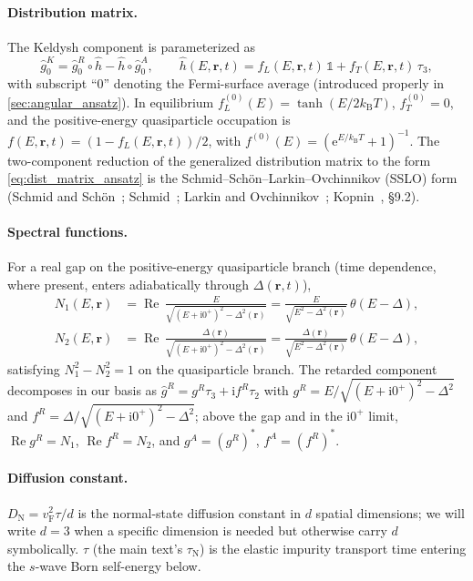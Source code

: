 \documentclass[
  aps,
  prb,
  preprint,
  superscriptaddress,
  longbibliography,
  nofootinbib
]{revtex4-2}
\newcommand{\ee}{\mathrm{e}}
\newcommand{\ii}{\mathrm{i}}
\newcommand{\br}{\mathbf{r}}
\newcommand{\vF}{v_{\mathrm{F}}}
\newcommand{\DOS}{N_1}
\newcommand{\DN}{D_{\mathrm{N}}}
\newcommand{\fL}{f_L}
\newcommand{\fT}{f_T}
\newcommand{\hatg}{\hat{g}}
\providecommand{\openone}{}\renewcommand{\openone}{\mathds{1}}
\newcommand{\Real}{\operatorname{Re}}
\begin{document}
\paragraph{Distribution matrix.} The Keldysh component is parameterized as
\begin{equation}
  \hatg_{0}^{K}
  =
  \hatg_{0}^{R}\circ \hat h - \hat h\circ \hatg_{0}^{A},
  \qquad
  \hat h(E,\br,t)=\fL(E,\br,t)\,\openone+\fT(E,\br,t)\,\tau_3 ,
  \label{eq:dist_matrix_ansatz}
\end{equation}
with subscript ``\(0\)'' denoting the Fermi-surface average (introduced
properly in \cref{sec:angular_ansatz}). In equilibrium
\(\fL^{(0)}(E)=\tanh(E/2k_{\mathrm B}T)\), \(\fT^{(0)}=0\), and the positive-energy
quasiparticle occupation is
\(f(E,\br,t)=(1-\fL(E,\br,t))/2\), with
\(f^{(0)}(E)=(\ee^{E/k_{\mathrm B}T}+1)^{-1}\). The two-component reduction of the
generalized distribution matrix to the form
\cref{eq:dist_matrix_ansatz} is the
Schmid--Sch\"on--Larkin--Ovchinnikov (SSLO) form
(Schmid and Sch\"on~\cite{schmidschon1975}; Schmid~\cite{schmid1980}; Larkin and Ovchinnikov~\cite{larkin1986};
Kopnin~\cite{kopnin2001}, \S 9.2).

\paragraph{Spectral functions.} For a real gap on the positive-energy
quasiparticle branch (time dependence, where present, enters adiabatically
through \(\Delta(\br,t)\)),
\begin{align}
  \DOS(E,\br) &= \Real\,\frac{E}{\sqrt{(E+\ii 0^+)^2-\Delta^2(\br)}}
              = \frac{E}{\sqrt{E^2-\Delta^2(\br)}}\,\theta(E-\Delta), \\
  N_2(E,\br) &= \Real\,\frac{\Delta(\br)}{\sqrt{(E+\ii 0^+)^2-\Delta^2(\br)}}
              = \frac{\Delta(\br)}{\sqrt{E^2-\Delta^2(\br)}}\,\theta(E-\Delta),
\end{align}
satisfying \(\DOS^2-N_2^2=1\) on the quasiparticle branch. The retarded
component decomposes in our basis as
\(\hatg^{R}=g^{R}\tau_3+\ii f^{R}\tau_2\) with
\(g^{R}=E/\sqrt{(E+\ii 0^+)^2-\Delta^2}\) and
\(f^{R}=\Delta/\sqrt{(E+\ii 0^+)^2-\Delta^2}\); above the gap and in the
\(\ii 0^+\) limit, \(\Real g^{R}=\DOS\), \(\Real f^{R}=N_2\), and
\(g^{A}=(g^{R})^*\), \(f^{A}=(f^{R})^*\).

\paragraph{Diffusion constant.} \(\DN=\vF^2\tau/d\) is the normal-state
diffusion constant in \(d\) spatial dimensions; we will write \(d=3\) when a
specific dimension is needed but otherwise carry \(d\) symbolically.
\(\tau\) (the main text's \(\tau_{\mathrm N}\)) is the elastic impurity
transport time entering the \(s\)-wave Born
self-energy below.
\end{document}
